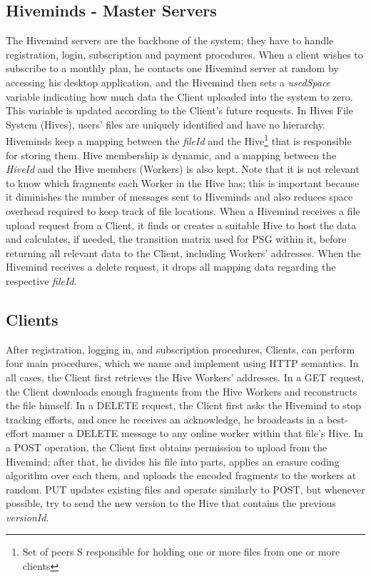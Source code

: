 \documentclass[runningheads]{llncs}
\begin{document}
\subsection{Hiveminds - Master Servers}
The Hivemind servers are the backbone of the system; they have to handle registration, login, subscription and payment procedures. When a client wishes to subscribe to a monthly plan, he contacts one Hivemind server at random by accessing his desktop application, and the Hivemind then sets a \textit{usedSpace} variable indicating how much data the Client uploaded into the system to zero. This variable is updated according to the Client's future requests. In Hives File System (Hives), users' files are uniquely identified and have no hierarchy. Hiveminds keep a mapping between the \textit{fileId} and the Hive\footnote{Set of peers S responsible for holding one or more files from one or more clients} that is responsible for storing them. Hive membership is dynamic, and a mapping between the \textit{HiveId} and the Hive members (Workers) is also kept. Note that it is not relevant to know which fragments each Worker in the Hive has; this is important because it diminishes the number of messages sent to Hiveminds and also reduces space overhead required to keep track of file locations. When a Hivemind receives a file upload request from a Client, it finds or creates a suitable Hive to host the data and calculates, if needed, the transition matrix used for PSG within it, before returning all relevant data to the Client, including Workers' addresses. When the Hivemind receives a delete request, it drops all mapping data regarding the respective \textit{fileId}.

\subsection{Clients}
After registration, logging in, and subscription procedures, Clients, can perform four main procedures, which we name and implement using HTTP semantics. In all cases, the Client first retrieves the Hive Workers' addresses. In a GET request, the Client downloads enough fragments from the Hive Workers and reconstructs the file himself. In a DELETE request, the Client first asks the Hivemind to stop tracking efforts, and once he receives an acknowledge, he broadcasts in a best-effort manner a DELETE message to any online worker within that file's Hive. In a POST operation, the Client first obtains permission to upload from the Hivemind; after that, he divides his file into parts, applies an erasure coding algorithm over each them, and uploads the encoded fragments to the workers at random. PUT updates existing files and operate similarly to POST, but whenever possible, try to send the new version to the Hive that contains the previous \textit{versionId}.
\end{document}

